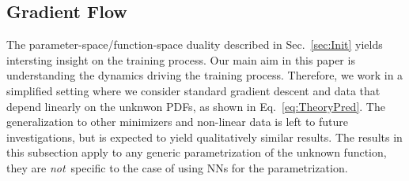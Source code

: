 \subsection{Gradient Flow}
\label{sec:GradFlow}

The parameter-space/function-space duality described in Sec.~\ref{sec:Init} yields intersting insight
on the training process. Our main aim in this paper is understanding the dynamics driving the
training process. Therefore, we work in a simplified setting where we consider standard gradient descent
and data that depend linearly on the unknwon PDFs, as shown in Eq.~\eqref{eq:TheoryPred}. The generalization
to other minimizers and non-linear data is left to future investigations, but is expected to yield
qualitatively similar results. The results
in this subsection apply to any generic parametrization of the unknown function, they are {\em not}\
specific to the case of using NNs for the parametrization.


